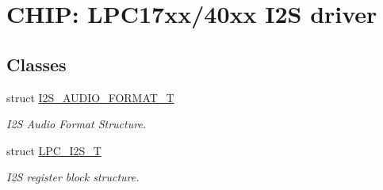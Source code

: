 \hypertarget{group__I2S__17XX__40XX}{}\section{C\+H\+IP\+: L\+P\+C17xx/40xx I2S driver}
\label{group__I2S__17XX__40XX}
\subsection*{Classes}
\begin{DoxyCompactItemize}
\item 
struct \hyperlink{structI2S__AUDIO__FORMAT__T}{I2\+S\+\_\+\+A\+U\+D\+I\+O\+\_\+\+F\+O\+R\+M\+A\+T\+\_\+T}
\begin{DoxyCompactList}\small\item\em I2S Audio Format Structure. \end{DoxyCompactList}\item 
struct \hyperlink{structLPC__I2S__T}{L\+P\+C\+\_\+\+I2\+S\+\_\+T}
\begin{DoxyCompactList}\small\item\em I2S register block structure. \end{DoxyCompactList}\end{DoxyCompactItemize}
